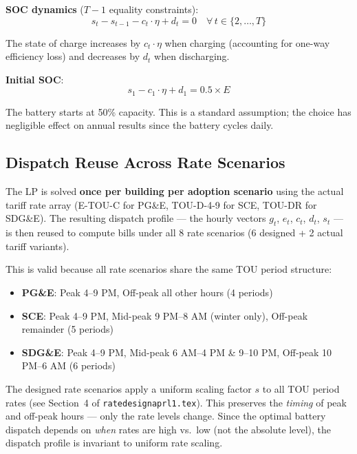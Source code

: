 \documentclass[11pt]{article}
\begin{document}
\textbf{SOC dynamics} ($T - 1$ equality constraints):
\begin{equation}
    s_t - s_{t-1} - c_t \cdot \eta + d_t = 0 \quad \forall \, t \in \{2, \ldots, T\}
\end{equation}

The state of charge increases by $c_t \cdot \eta$ when charging (accounting for one-way efficiency loss) and decreases by $d_t$ when discharging.

\textbf{Initial SOC}:
\begin{equation}
    s_1 - c_1 \cdot \eta + d_1 = 0.5 \times E
\end{equation}

The battery starts at 50\% capacity. This is a standard assumption; the choice has negligible effect on annual results since the battery cycles daily.

\subsection{Dispatch Reuse Across Rate Scenarios}

The LP is solved \textbf{once per building per adoption scenario} using the actual tariff rate array (E-TOU-C for PG\&E, TOU-D-4-9 for SCE, TOU-DR for SDG\&E). The resulting dispatch profile --- the hourly vectors $g_t$, $e_t$, $c_t$, $d_t$, $s_t$ --- is then reused to compute bills under all 8 rate scenarios (6 designed + 2 actual tariff variants).

This is valid because all rate scenarios share the same TOU period structure:
\begin{itemize}
    \item \textbf{PG\&E}: Peak 4--9 PM, Off-peak all other hours (4 periods)
    \item \textbf{SCE}: Peak 4--9 PM, Mid-peak 9 PM--8 AM (winter only), Off-peak remainder (5 periods)
    \item \textbf{SDG\&E}: Peak 4--9 PM, Mid-peak 6 AM--4 PM \& 9--10 PM, Off-peak 10 PM--6 AM (6 periods)
\end{itemize}

The designed rate scenarios apply a uniform scaling factor $s$ to all TOU period rates (see Section~4 of \texttt{ratedesignaprl1.tex}). This preserves the \textit{timing} of peak and off-peak hours --- only the rate levels change. Since the optimal battery dispatch depends on \textit{when} rates are high vs.\ low (not the absolute level), the dispatch profile is invariant to uniform rate scaling.
\end{document}
